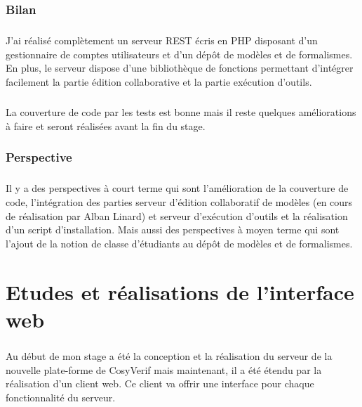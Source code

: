 \documentclass{report}
\begin{document}
\subsection{Bilan}

\paragraph{}
J'ai réalisé complètement un serveur REST écris en PHP disposant d'un gestionnaire de comptes utilisateurs et d'un 
dépôt de modèles et de formalismes. En plus, le serveur dispose d'une bibliothèque de fonctions permettant 
d'intégrer facilement la partie édition collaborative et la partie exécution d'outils. 

\paragraph{}
La couverture de code par les tests est bonne mais il reste quelques améliorations à faire et seront réalisées avant la
fin du stage.

\subsection{Perspective}

\paragraph{}
Il y a des perspectives à court terme qui sont l'amélioration de la couverture de code, l'intégration des parties
serveur d'édition collaboratif de modèles (en cours de réalisation par Alban Linard) et serveur d'exécution d'outils 
et la réalisation d'un script d'installation. Mais aussi des perspectives à moyen terme qui sont l'ajout de la notion de 
classe d'étudiants au dépôt de modèles et de formalismes.


\chapter{Etudes et réalisations de l'interface web}

\paragraph{}
Au début de mon stage a été la conception et la réalisation du serveur de la nouvelle plate-forme de CosyVerif mais
maintenant, il a été étendu par la réalisation d'un client web. Ce client va offrir une interface pour chaque fonctionnalité
du serveur. 
\end{document}
